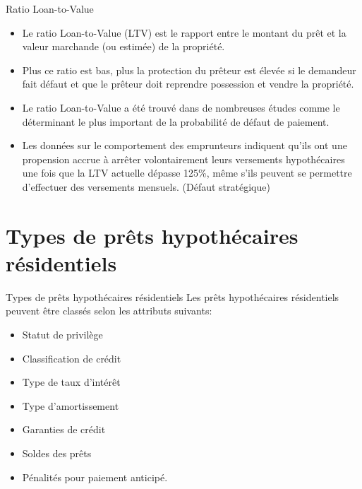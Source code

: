 \documentclass[10pt,a4paper]{beamer}
\begin{document}
\begin{frame}{Ratio Loan-to-Value}
\begin{itemize}[label=\bullet]
\item Le ratio Loan-to-Value (LTV) est le rapport entre le montant du prêt et la valeur marchande (ou estimée) de la propriété.
\vspace{0.5cm}
\item Plus ce ratio est bas, plus la protection du prêteur est élevée si le demandeur fait défaut et que le prêteur doit reprendre possession et vendre la propriété.
\vspace{0.5cm}
\item Le ratio Loan-to-Value a été trouvé dans de nombreuses études comme le déterminant le plus important de la probabilité de défaut de paiement.
\vspace{0.5cm}
\item Les données sur le comportement des emprunteurs indiquent qu'ils ont une propension accrue à arrêter volontairement leurs versements hypothécaires une fois que la LTV actuelle dépasse 125\%, même s'ils peuvent se permettre d'effectuer des versements mensuels. (Défaut stratégique)
\end{itemize}
\end{frame}


\section{Types de prêts hypothécaires résidentiels}

\begin{frame}{Types de prêts hypothécaires résidentiels}
Les prêts hypothécaires résidentiels peuvent être classés selon les attributs suivants:
\begin{itemize}[label=\bullet]
\item Statut de privilège
\item Classification de crédit
\item Type de taux d'intérêt
\item Type d'amortissement
\item Garanties de crédit
\item Soldes des prêts
\item Pénalités pour paiement anticipé.
\end{itemize}
\end{frame}
\end{document}
